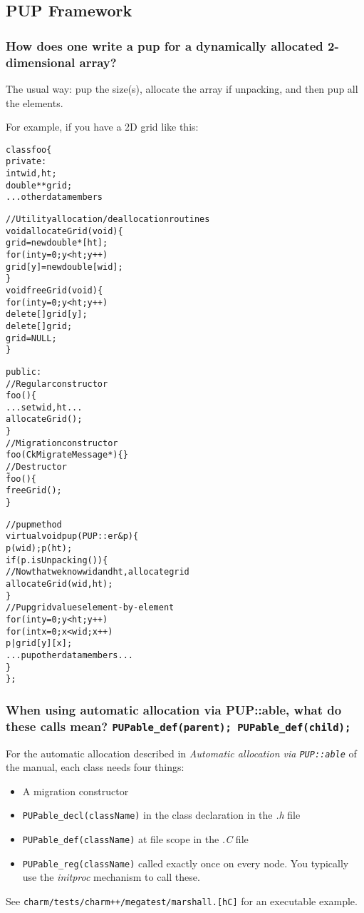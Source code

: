 \subsection{PUP Framework}

\subsubsection{How does one write a pup for a dynamically allocated 2-dimensional array?}

The usual way: pup the size(s), allocate the array if unpacking, and
then pup all the elements.

For example, if you have a 2D grid like this:
\begin{alltt}
class foo \{
 private:
  int wid,ht;
  double **grid;
  ...other data members

  //Utility allocation/deallocation routines
  void allocateGrid(void) \{
    grid=new double*[ht];
    for (int y=0;y<ht;y++)
      grid[y]=new double[wid];
  \}
  void freeGrid(void) \{
    for (int y=0;y<ht;y++)
      delete[] grid[y];
    delete[] grid;
    grid=NULL;
  \}

 public:
  //Regular constructor
  foo() \{
    ...set wid, ht...
    allocateGrid();
  \}
  //Migration constructor
  foo(CkMigrateMessage *) \{\}
  //Destructor
  \~foo() \{
    freeGrid();
  \}

  //pup method
  virtual void pup(PUP::er \&p) \{
    p(wid); p(ht);
    if (p.isUnpacking()) \{
      //Now that we know wid and ht, allocate grid
      allocateGrid(wid,ht);
    \}
    //Pup grid values element-by-element
    for (int y=0;y<ht;y++)
      for (int x=0; x<wid; x++)
        p|grid[y][x];
    ...pup other data members...
  \}
\};
\end{alltt}

\subsubsection{When using automatic allocation via PUP::able, what do these calls mean?
{\tt PUPable\_def(parent); PUPable\_def(child);}}

For the automatic allocation described in {\em Automatic allocation via
{\tt PUP::able}} of the manual, each class needs four things:
\begin{itemize}
\item A migration constructor

\item
{\tt PUPable\_decl(className)} in the class declaration in the {\em .h}
file

\item
{\tt PUPable\_def(className)} at file scope in the {\em .C} file

\item
{\tt PUPable\_reg(className)} called exactly once on every node. You
typically use the {\em initproc} mechanism to call these.
\end{itemize}
See {\tt charm/tests/charm++/megatest/marshall.[hC]} for an executable
example.

